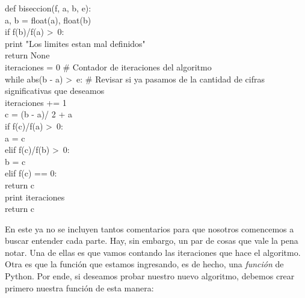 \documentclass[10pt,letterpaper]{article}
\newenvironment{Code}
{
\begin{lrbox}{\selvestebox}%
\begin{minipage}{\dimexpr\columnwidth-2\fboxsep\relax}
\fontfamily{\ttdefault}\selectfont
}
{\end{minipage}\end{lrbox}%
\begin{center}
\colorbox{light-gray}{\usebox{\selvestebox}}
\end{center}
}
\begin{document}
\begin{footnotesize}
\begin{Code}
def biseccion(f, a, b, e):\\
\hspace*{5mm} a,  b = float(a), float(b)\\
\hspace*{5mm} if f(b)/f(a) >\ 0:\\
\hspace*{11mm} print "Los limites estan mal definidos"\\
\hspace*{11mm} return None\\
\hspace*{5mm} iteraciones = 0 \# Contador de iteraciones del algoritmo\\
\hspace*{5mm} while abs(b - a) >\ e: \# Revisar si ya pasamos de la cantidad de cifras significativas que deseamos\\
\hspace*{11mm} iteraciones += 1\\
\hspace*{11mm} c = (b - a)/ 2 + a\\
\hspace*{11mm} if f(c)/f(a) >\ 0:\\
\hspace*{17mm} a = c\\
\hspace*{11mm} elif f(c)/f(b) >\ 0:\\
\hspace*{17mm} b = c\\
\hspace*{11mm} elif f(c) == 0:\\
\hspace*{17mm} return c\\
\hspace*{5mm} print iteraciones\\
\hspace*{5mm} return c
\end{Code}
\end{footnotesize}

En este ya no se incluyen tantos comentarios para que nosotros comencemos a buscar entender cada parte. Hay, sin embargo, un par de cosas que vale la pena notar. Una de ellas es que vamos contando las iteraciones que hace el algoritmo. Otra es que la funci\'on que estamos ingresando, es de hecho, una \emph{funci\'on} de Python. Por ende, si deseamos probar nuestro nuevo algoritmo, debemos crear primero nuestra funci\'on de esta manera:
\end{document}
